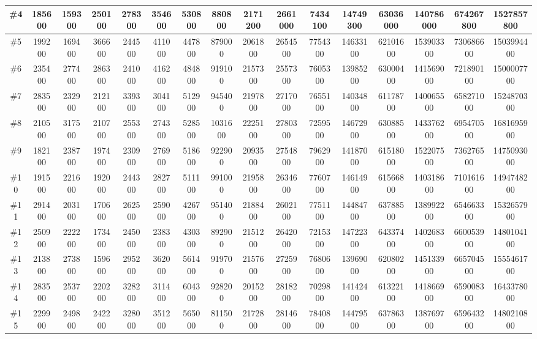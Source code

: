 \documentclass[titlepage]{article}
\begin{document}
\begin{landscape}
\begin{table}[h]
\begin{tabular}{|c|c|c|c|c|c|c|c|c|c|c|c|c|c|c|c|}
			\hline
			\#4      & 185600 & 159300 & 250100 & 278300 & 354600 & 530800 & 880800  & 2171200 & 2661000 & 7434100 & 14749300 & 63036000 & 140786000 & 674267800 & 1527857800  \\ 
			\hline
			\#5      & 199200 & 169400 & 366600 & 244500 & 411000 & 447800 & 879000  & 2061800 & 2654500 & 7754300 & 14633100 & 62101600 & 153903300 & 730686600 & 1503994400  \\ 
			\hline
			\#6      & 235400 & 277400 & 286300 & 241000 & 416200 & 484800 & 919100  & 2157300 & 2557300 & 7605300 & 13985200 & 63000400 & 141569000 & 721890100 & 1500007700  \\ 
			\hline
			\#7      & 283500 & 232900 & 212100 & 339300 & 304100 & 512900 & 945400  & 2197800 & 2717000 & 7655100 & 14034800 & 61178700 & 140065500 & 658271000 & 1524870300  \\ 
			\hline
			\#8      & 210500 & 317500 & 210700 & 255300 & 274300 & 528500 & 1031600 & 2225100 & 2780300 & 7259500 & 14672900 & 63088500 & 143376200 & 695470500 & 1681695900  \\ 
			\hline
			\#9      & 182100 & 238700 & 197400 & 230900 & 276900 & 518600 & 922900  & 2093500 & 2754800 & 7962900 & 14187000 & 61518000 & 152207500 & 736276500 & 1475093000  \\ 
			\hline
			\#10     & 191500 & 221600 & 192000 & 244300 & 282700 & 511100 & 991000  & 2195800 & 2634600 & 7760700 & 14614900 & 61566800 & 140318600 & 710161600 & 1494748200  \\ 
			\hline
			\#11     & 291400 & 203100 & 170600 & 262500 & 259000 & 426700 & 951400  & 2188400 & 2602100 & 7751100 & 14484700 & 63788500 & 138992200 & 654663300 & 1532657900  \\ 
			\hline
			\#12     & 250900 & 222200 & 173400 & 245000 & 238300 & 430300 & 892900  & 2151200 & 2642000 & 7215300 & 14722300 & 64337400 & 140268300 & 660053900 & 1480104100  \\ 
			\hline
			\#13     & 213800 & 273800 & 159600 & 295200 & 362000 & 561400 & 919700  & 2157600 & 2725900 & 7680600 & 13969000 & 62080200 & 145133900 & 665704500 & 1555461700  \\ 
			\hline
			\#14     & 283500 & 253700 & 220200 & 328200 & 311400 & 604300 & 928200  & 2015200 & 2818200 & 7029800 & 14142400 & 61322100 & 141866900 & 659008300 & 1643378000  \\ 
			\hline
			\#15     & 229900 & 249800 & 242200 & 328000 & 351200 & 565000 & 811500  & 2172800 & 2814600 & 7840800 & 14479500 & 63786300 & 138769700 & 659643200 & 1480210800  \\ 

\end{tabular}
\end{table}
\end{landscape}
\end{document}
